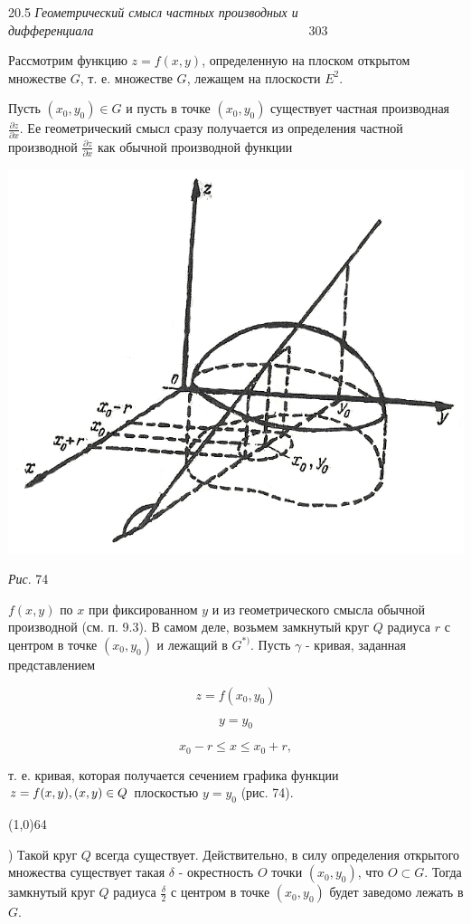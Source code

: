 \documentclass[a4paper,12pt]{book}
\begin{document}
\fontsize{14pt}{14pt}\selectfont
\parindent=0.0cm
{\small 20.5 \textit{Геометрический смысл частных производных и дифференциала}\ \ \ \ \ \ \ \ \ \ \ \ \ \ \ \ \ \ \ \ \ \ \ \ \ \ \ \ \ \ \ \ \ \ 303}\par
\vspace{1.5em}
\parindent=0.7cm
Рассмотрим функцию $z=f(x, y)$, определенную на плоском открытом множестве $G$, т. е. множестве $G$, лежащем на плоскости $E^2$.\par
\parindent=0.0cm
Пусть $(x_0,y_0) \in G$ и пусть в точке $(x_0,y_0)$ существует частная производная $\frac{\partial z}{\partial x}$. Ее геометрический смысл сразу получается из определения частной производной $\frac{\partial z}{\partial x}$ как обычной производной функции\par
\begin{center}
\includegraphics[scale=1.5]{grafik.png}\par
{\small \textit{Рис}. 74}\par
\end{center}
$f(x,y)$ по $x$ при фиксированном $y$ и из геометрического смысла обычной производной (см. п. 9.3). В самом деле, возьмем замкнутый круг $Q$ радиуса $r$ с центром в точке $(x_0,y_0)$ и лежащий в $G^{*)}$. Пусть $\gamma$ - кривая, заданная представлением\par
$$
z=f(x_0,y_0)
$$\par
$$
y=y_0
$$\par
$$
x_0-r \leqslant x \leqslant x_0+r,
$$\par
т. е. кривая, которая получается сечением графика функции $z=f(x,y), (x,y) \\
\in Q$ плоскостью $y=y_0$ (рис. 74).\par
\line(1,0){64}\par
\parindent=0.7cm
{\small *) Такой круг $Q$ всегда существует. Действительно, в силу определения открытого множества существует такая $\delta$ - окрестность $O$ точки $(x_0,y_0)$, что $O \subset G$. Тогда замкнутый круг $Q$ радиуса $\frac{\delta}{2}$ с центром в точке $(x_0,y_0)$ будет заведомо лежать в $G$.
}
\end{document}
